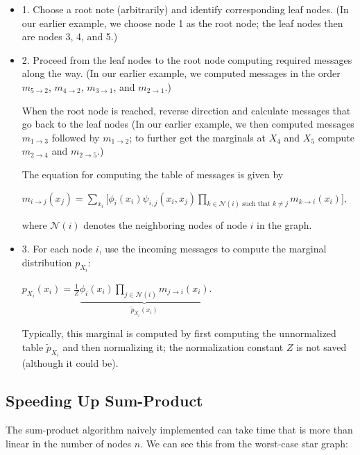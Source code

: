 \documentclass[6008notes.tex]{subfiles}
\begin{document}
\begin{itemize}
\item 1. Choose a root note (arbitrarily) and identify corresponding leaf nodes.
(In our earlier example, we choose node 1 as the root node; the leaf nodes then are nodes 3, 4, and 5.)

\item 2. Proceed from the leaf nodes to the root node computing required messages along the way.
(In our earlier example, we computed messages in the order $m_{5\rightarrow 2}$, $m_{4\rightarrow 2}$, $m_{3\rightarrow 1}$, and $m_{2\rightarrow 1}$.)

When the root node is reached, reverse direction and calculate messages that go back to the leaf nodes
(In our earlier example, we then computed messages $m_{1\rightarrow 3}$ followed by $m_{1\rightarrow 2}$; to further get the marginals at $X_4$ and $X_5$ compute $m_{2\rightarrow 4}$ and $m_{2\rightarrow 5}$.)

The equation for computing the table of messages is given by

{\centering$m_{i\rightarrow j}(x_{j})=\sum _{x_{i}}\bigg[\phi _{i}(x_{i})\psi _{i,j}(x_{i},x_{j})\prod _{k\in \mathcal{N}(i)\text { such that }k\ne j}m_{k\rightarrow i}(x_{i})\bigg],$ \par}
 
where $\mathcal{N}(i)$ denotes the neighboring nodes of node $i$ in the graph.

\item 3. For each node $i$, use the incoming messages to compute the marginal distribution $p_{X_i}$:

{\centering$p_{X_{i}}(x_{i})=\frac{1}{Z}\underbrace{\phi _{i}(x_{i})\prod _{j\in \mathcal{N}(i)}m_{j\rightarrow i}(x_{i})}_{\widetilde{p}_{X_{i}}(x_{i})}.$ \par}
 
Typically, this marginal is computed by first computing the unnormalized table $\widetilde{p}_{X_{i}}$ and then normalizing it; the normalization constant $Z$ is not saved (although it could be).
\end{itemize}


\subsection{Speeding Up Sum-Product}

The sum-product algorithm naively implemented can take time that is more than linear in the number of nodes $n$. We can see this from the worst-case star graph:
\end{document}

